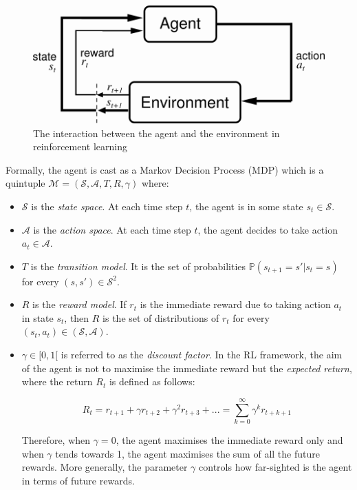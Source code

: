         \begin{figure}[ht]
          \centering
          \includegraphics[scale=0.8]{figures/RL.png}
          \caption{The interaction between the agent and the environment in reinforcement learning}
          \label{fig:rlscheme}
        \end{figure}
        
        Formally, the agent is cast as a Markov Decision Process (MDP) which is a quintuple $\mathcal{M} = (\mathcal{S},\mathcal{A},T,R,\gamma)$ where:
        \begin{itemize}
        	\item $\mathcal{S}$ is the \textit{state space}. At each time step $t$, the agent is in some state $s_t \in \mathcal{S}$.
            \item $\mathcal{A}$ is the \textit{action space}. At each time step $t$, the agent decides to take action $a_t \in \mathcal{A}$.
            \item $T$ is the \textit{transition model}. It is the set of probabilities $\mathbb{P} (s_{t+1} = s'|s_t = s)$ for every $(s,s') \in \mathcal{S}^2$.
            \item $R$ is the \textit{reward model}. If $r_t$ is the immediate reward due to taking action $a_t$ in state $s_t$, then $R$ is the set of distributions of $r_t$ for every $(s_t,a_t) \in (\mathcal{S},\mathcal{A})$.
            \item $\gamma \in [0,1[$ is referred to as the \textit{discount factor}. In the RL framework, the aim of the agent is not to maximise the immediate reward but the \textit{expected return}, where the return $R_t$ is defined as follows:
            
            $$ R_t = r_{t+1} + \gamma r_{t+2} + \gamma^2 r_{t+3} + ... = \sum_{k=0}^\infty \gamma^k r_{t+k+1} $$
            
            Therefore, when $\gamma = 0$, the agent maximises the immediate reward only and when $\gamma$ tends towards 1, the agent maximises the sum of all the future rewards. More generally, the parameter $\gamma$ controls how far-sighted is the agent in terms of future rewards.
		\end{itemize}
        
